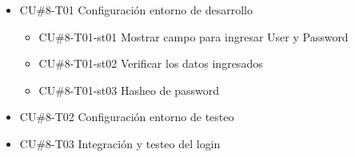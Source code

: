
\begin{itemize}
    \item CU\#8-T01 Configuración entorno de desarrollo
    \begin{itemize}
        \item CU\#8-T01-st01 Mostrar campo para ingresar User y Password
        \item CU\#8-T01-st02 Verificar los datos ingresados
        \item CU\#8-T01-st03 Hasheo de password
    \end{itemize}
    \item CU\#8-T02 Configuración entorno de testeo
    \item CU\#8-T03 Integración y testeo del login
\end{itemize}

